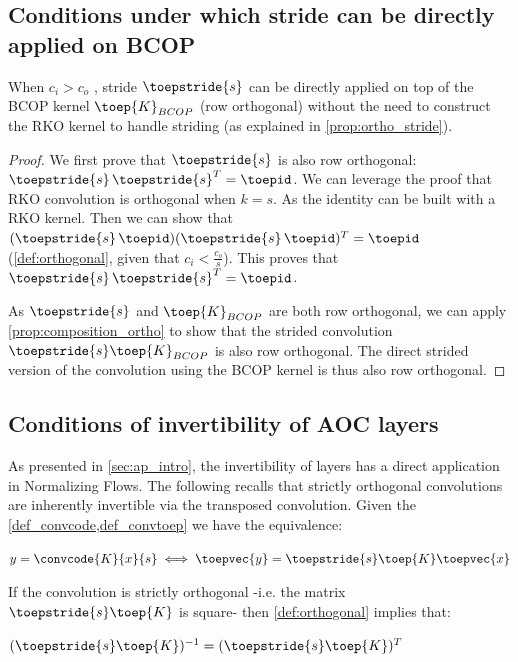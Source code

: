     \subsection{Conditions under which stride can be directly applied on BCOP}\label{proof:stride_opt}

        When $ c_i > c_o $ , stride $ \toepstride{s}$ can be directly applied on top of the BCOP kernel $\toep{K}_{BCOP}$ (row orthogonal) without the need to construct the RKO kernel to handle striding (as explained in \cref{prop:ortho_stride}). 
        \begin{proof}
        We first prove that $ \toepstride{s}$ is also row orthogonal: $ \toepstride{s} \, \toepstride{s}^T = \toepid$. We can leverage the proof that RKO convolution is orthogonal when $k=s$. As the identity can be built with a RKO kernel. Then we can show  that $ (\toepstride{s} \, \toepid)(\toepstride{s} \, \toepid)^T = \toepid $ (\cref{def:orthogonal}, given that $ c_i < \frac{c_o}{s}$). This proves that $ \toepstride{s} \, \toepstride{s}^T = \toepid $. %

        As $\toepstride{s}$ and $\toep{K}_{BCOP}$ are both row orthogonal, we can apply \cref{prop:composition_ortho} to show that the strided convolution $\toepstride{s}\toep{K}_{BCOP}$ is also row orthogonal.
        The direct strided version of the convolution using the BCOP kernel is thus also row orthogonal.
    \end{proof}
    
    \subsection{Conditions of invertibility of AOC layers}\label{ap:invert}
    As presented in \cref{sec:ap_intro}, the invertibility of layers has a direct application in Normalizing Flows. The following recalls that strictly orthogonal convolutions are inherently invertible via the transposed convolution.
    Given the \cref{def_convcode,def_convtoep} we have the equivalence:
    
    $y = \convcode{K}{x}{s} \iff \toepvec{y} = \toepstride{s} \toep{K} \toepvec{x}$

    If the convolution is strictly orthogonal -i.e. the matrix $\toepstride{s} \toep{K}$ is square- then \cref{def:orthogonal} implies that:

    $(\toepstride{s} \toep{K})^{-1} = (\toepstride{s} \toep{K})^T$

